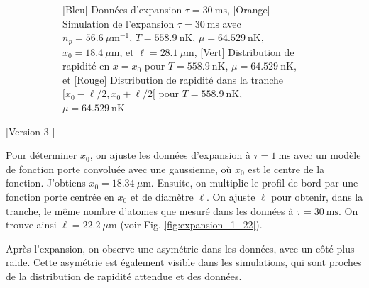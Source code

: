 \documentclass[a3, 10pt,twoside]{article}          %
\theoremstyle{plain}
\theoremstyle{definition}
\theoremstyle{remark}
\theoremstyle{definition} %
\begin{document}
\begin{figure}[H]
\begin{subfigure}[b]{0.45\textwidth}
        \caption{{\color{blue}[Bleu] Données d'expansion $\tau = 30~\text{ms}$}, {\color{orange}[Orange] Simulation de l'expansion $\tau = 30~\text{ms}$ avec $n_p = 56.6~\mu \text{m}^{-1}$, $T = 558.9~\text{nK}$, $\mu = 64.529~\text{nK}$, $x_0 = 18.4~\mu \text{m}$, et $\ell = 28.1~\mu \text{m}$}, {\color{OliveGreen}[Vert] Distribution de rapidité en $x = x_0$ pour $T = 558.9~\text{nK}$, $\mu = 64.529~\text{nK}$}, et {\color{red}[Rouge] Distribution de rapidité dans la tranche $[x_0 - \ell/2, x_0 + \ell/2 [$ pour $T = 558.9~\text{nK}$, $\mu = 64.529~\text{nK}$}}
        \label{fig:expansion_30_28}
    \end{subfigure}
    \caption{}
    \label{}
\end{figure}

	
		
	[Version 3 ]
	
	Pour déterminer $x_0$, on ajuste les données d'expansion à $\tau = 1~\text{ms}$ avec un modèle de fonction porte convoluée avec une gaussienne, où $x_0$ est le centre de la fonction. J'obtiens $x_0 = 18.34~\mu \text{m}$. Ensuite, on multiplie le profil de bord par une fonction porte centrée en $x_0$ et de diamètre $\ell$. On ajuste $\ell$ pour obtenir, dans la tranche, le même nombre d'atomes que mesuré dans les données à $\tau = 30~\text{ms}$. On trouve ainsi $\ell = 22.2~\mu \text{m}$ (voir Fig. \ref{fig:expansion_1_22}).

Après l'expansion, on observe une asymétrie dans les données, avec un côté plus raide. Cette asymétrie est également visible dans les simulations, qui sont proches de la distribution de rapidité attendue et des données.
\end{document}
